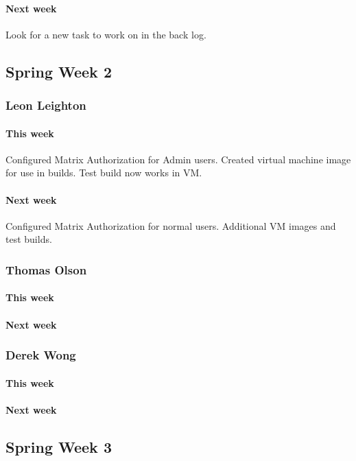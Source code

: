 \documentclass[10pt,letterpaper,onecolumn,draftclsnofoot]{IEEEtran}
\begin{document}
\paragraph{Next week}Look for a new task to work on in the back log.

\subsection{Spring Week 2}
\subsubsection{Leon Leighton}
\paragraph{This week}Configured Matrix Authorization for Admin users.    
Created virtual machine image for use in builds. Test build now works in VM.
\paragraph{Next week}Configured Matrix Authorization for normal users.  
Additional VM images and test builds.

\subsubsection{Thomas Olson}
\paragraph{This week}
\paragraph{Next week}

\subsubsection{Derek Wong}
\paragraph{This week}
\paragraph{Next week}

\subsection{Spring Week 3}
\end{document}
